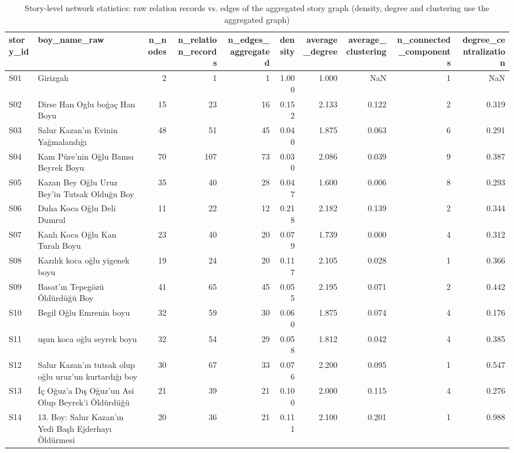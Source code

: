 \begin{table}
\caption{Story-level network statistics: raw relation records vs. edges of the aggregated story graph (density, degree and clustering use the aggregated graph)}
\label{tab:t03_story_level_statistics}
\begin{tabular}{llrrrrrrrr}
\toprule
story_id & boy_name_raw & n_nodes & n_relation_records & n_edges_aggregated & density & average_degree & average_clustering & n_connected_components & degree_centralization \\
\midrule
S01 & Girizgah & 2 & 1 & 1 & 1.000 & 1.000 & NaN & 1 & NaN \\
S02 & Dirse Han Oglu boğaç Han Boyu & 15 & 23 & 16 & 0.152 & 2.133 & 0.122 & 2 & 0.319 \\
S03 & Salur Kazan'ın Evinin Yağmalandığı & 48 & 51 & 45 & 0.040 & 1.875 & 0.063 & 6 & 0.291 \\
S04 & Kam Püre'nin Oğlu Bamsı Beyrek Boyu & 70 & 107 & 73 & 0.030 & 2.086 & 0.039 & 9 & 0.387 \\
S05 & Kazan Bey Oğlu Uruz Bey'in Tutsak Olduğu Boy & 35 & 40 & 28 & 0.047 & 1.600 & 0.006 & 8 & 0.293 \\
S06 & Duha Koca Oğlu Deli Dumrul & 11 & 22 & 12 & 0.218 & 2.182 & 0.139 & 2 & 0.344 \\
S07 & Kanlı Koca Oğlu Kan Turalı Boyu & 23 & 40 & 20 & 0.079 & 1.739 & 0.000 & 4 & 0.312 \\
S08 & Kazılık koca oğlu yigenek boyu & 19 & 24 & 20 & 0.117 & 2.105 & 0.028 & 1 & 0.366 \\
S09 & Basat'ın Tepegözü Öldürdüğü Boy & 41 & 65 & 45 & 0.055 & 2.195 & 0.071 & 2 & 0.442 \\
S10 & Begil Oğlu Emrenin boyu & 32 & 59 & 30 & 0.060 & 1.875 & 0.074 & 4 & 0.176 \\
S11 & uşun koca oğlu seyrek boyu & 32 & 54 & 29 & 0.058 & 1.812 & 0.042 & 4 & 0.385 \\
S12 & Salur Kazan'ın tutsak olup oğlu uruz'un kurtardığı boy & 30 & 67 & 33 & 0.076 & 2.200 & 0.095 & 1 & 0.547 \\
S13 & İç Oğuz'a Dış Oğuz'un Asi Olup Beyrek'i Öldürdüğü & 21 & 39 & 21 & 0.100 & 2.000 & 0.115 & 4 & 0.276 \\
S14 & 13. Boy: Salur Kazan'ın Yedi Başlı Ejderhayı Öldürmesi & 20 & 36 & 21 & 0.111 & 2.100 & 0.201 & 1 & 0.988 \\
\bottomrule
\end{tabular}
\end{table}
